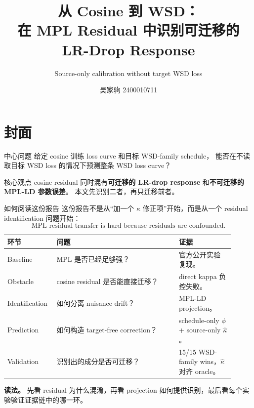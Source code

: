 \documentclass[9pt,aspectratio=169,fontset=fandol]{ctexbeamer}
\title[Residual identification in MPL residuals]{从 Cosine 到 WSD：\\在 MPL Residual 中识别可迁移的 LR-Drop Response}
\subtitle[Source-only calibration]{Source-only calibration without target WSD loss}
\author[吴家驹]{吴家驹 2400010711}
\institute[]{北京大学 \quad 深度学习课程 Task 2\\
\code{github.com/wjjpku/DL-final}}
\date{}
\newcommand{\hl}[1]{\textcolor{blue!60!black}{\textbf{#1}}}
\begin{document}
\section{封面}

{
\begin{frame}
\titlepage
\vspace{-1.2em}
\footnotesize
\begin{block}{中心问题}
给定 cosine 训练 loss curve 和目标 WSD-family schedule，
能否在不读取目标 WSD loss 的情况下预测整条 WSD loss curve？
\end{block}
\vspace{-0.45em}
\begin{block}{核心观点}
cosine residual 同时混有\hl{可迁移的 LR-drop response}
和\hl{不可迁移的 MPL-LD 参数误差}。
本文先识别二者，再只迁移前者。
\end{block}
\end{frame}}

\begin{frame}{如何阅读这份报告}
\small
这份报告不是从“加一个 \(\kappa\) 修正项”开始，而是从一个 residual identification 问题开始：
\[
\text{MPL residual transfer is hard because residuals are confounded.}
\]
\vfill
\begin{center}
\scriptsize
\begin{tabular}{L{0.17\linewidth}L{0.51\linewidth}L{0.23\linewidth}}
\toprule
环节 & 问题 & 证据\\
\midrule
Baseline & MPL 是否已经足够强？ & 官方公开实验复现。\\
\addlinespace
Obstacle & cosine residual 是否能直接迁移？ & direct kappa 负控失败。\\
\addlinespace
Identification & 如何分离 nuisance drift？ & MPL-LD projection。\\
\addlinespace
Prediction & 如何构造 target-free correction？ & schedule-only \(\phi\) + source-only \(\widehat\kappa\)。\\
\addlinespace
Validation & 识别出的成分是否可迁移？ & 15/15 WSD-family wins，\(\widehat\kappa\) 对齐 oracle。\\
\bottomrule
\end{tabular}
\end{center}
\vfill
\textbf{读法。}
先看 residual 为什么混淆，再看 projection 如何提供识别，最后看每个实验验证证据链中的哪一环。
\end{frame}

\end{document}
